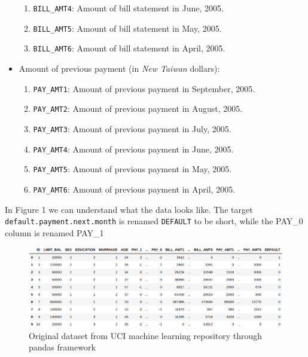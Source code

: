 \documentclass{article}
\begin{document}
\begin{itemize}
\begin{enumerate}[resume]
        \item \texttt{BILL\_AMT4}: Amount of bill statement in June, 2005.
        \item \texttt{BILL\_AMT5}: Amount of bill statement in May, 2005.
        \item \texttt{BILL\_AMT6}: Amount of bill statement in April, 2005.
     \end{enumerate}   
     \item Amount of previous payment (in \textit{New Taiwan} dollars):
     \begin{enumerate}[resume]
        \item \texttt{PAY\_AMT1}: Amount of previous payment in September, 2005.
        \item \texttt{PAY\_AMT2}: Amount of previous payment in August, 2005.
        \item \texttt{PAY\_AMT3}: Amount of previous payment in July, 2005.
        \item \texttt{PAY\_AMT4}: Amount of previous payment in June, 2005.
        \item \texttt{PAY\_AMT5}: Amount of previous payment in May, 2005.
        \item \texttt{PAY\_AMT6}: Amount of previous payment in April, 2005.

     \end{enumerate}  
\end{itemize}

In Figure 1 we can understand what the data looks like. The target \texttt{default.payment.next.month} is renamed \texttt{DEFAULT} to be short, while the PAY\_0 column is renamed PAY\_1

\begin{figure}[h]

\centering
\includegraphics[width=1\textwidth]{dfpandas.png}
\caption{Original dataset from UCI machine learning repository through pandas framework}
\end{figure}
\end{document}
